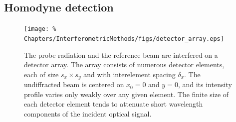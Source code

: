 \subsection{Homodyne detection}
\label{sec:InterferometricMethods:interferometry:homodyne}
\begin{figure}
  \centering
  \texttt{[image: \%
    Chapters/InterferometricMethods/figs/detector\_array.eps]}
  \caption[Finite sampling-volume effects in a detector array]{%
    The probe radiation and the reference beam
    are interfered on a detector array.
    The array consists of numerous detector elements,
    each of size $s_x \times s_y$ and with interelement spacing $\delta_x$.
    The undiffracted beam is centered on $x_0 = 0$ and $y = 0$, and
    its intensity profile varies only weakly over any given element.
    The finite size of each detector element tends to attenuate
    short wavelength components of the incident optical signal.
  }
  \label{fig:InterferometricMethods:detector_array}
\end{figure}

